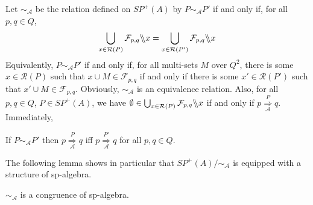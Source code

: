 \documentclass{CSML}
\newcommand{\quotientparallel}[2]{\ensuremath{#1\backslash\kern-3pt\backslash#2}}
\begin{document}
Let $\sim_{\mathcal{A}}$ be the relation defined on $SP^+(A)$ by $P\sim_{\mathcal{A}}P'$ if and only if, for all $p,q\in Q$,
\begin{equation}
\label{eq:cong}
\mathop\bigcup_{x\in \mathcal{R}(P)} \quotientparallel{\mathcal{F}_{p,q}}{x}
=
\mathop\bigcup_{x\in \mathcal{R}(P')} \quotientparallel{\mathcal{F}_{p,q}}{x}
\end{equation}
Equivalently, $P\sim_{\mathcal{A}}P'$ if and only if, for all multi-sets $M$ over $Q^2$, there is some $x\in \mathcal{R}(P)$ such that $x\cup M\in\mathcal{F}_{p,q}$ if and only if there is some $x'\in \mathcal{R}(P')$ such that $x'\cup M\in\mathcal{F}_{p,q}$.
Obviously, $\sim_{\mathcal{A}}$ is an equivalence relation.
Also, for all $p,q\in Q$, $P\in SP^+(A)$, we have $\emptyset\in\mathop\bigcup_{x\in \mathcal{R}(P)} \quotientparallel{\mathcal{F}_{p,q}}{x}$ if and only if $p\mathop{\Longrightarrow}\limits_{\mathcal{A}}^{P} q$. Immediately,
\begin{lem}
  \label{lem:congChemin}
  If $P\sim_\mathcal{A}P'$ then $p\mathop{\Longrightarrow}\limits_{\mathcal{A}}^{P} q$ iff $p\mathop{\Longrightarrow}\limits_{\mathcal{A}}^{P'} q$ for all $p,q\in Q$.
\end{lem}

The following lemma shows in particular that $SP^+(A)/\mathord\sim_\mathcal{A}$ is equipped with a structure of sp-algebra.
\begin{lem}
  \label{lem:cong}
  $\sim_{\mathcal{A}}$ is a congruence of sp-algebra.
\end{lem}
\end{document}
